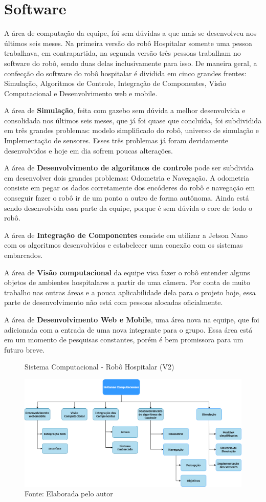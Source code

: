 \documentclass[../delivery_hospital_report.tex]{subfiles}
\begin{document}
\section{Software}

A área de computação da equipe, foi sem dúvidas a que mais se desenvolveu nos últimos seis meses. Na primeira versão do robô Hospitalar somente uma pessoa trabalhava, em contrapartida, na segunda versão três pessoas trabalham no software do robô, sendo duas delas inclusivamente para isso. De maneira geral, a confecção do software do robô hospitalar é dividida em cinco grandes frentes: Simulação, Algoritmos de Controle, Integração de Componentes, Visão Computacional e Desenvolvimento web e mobile.

A área de \textbf{Simulação}, feita com gazebo \cite{gazebo21} sem dúvida a melhor desenvolvida e consolidada nos últimos seis meses, que já foi quase que concluída, foi subdividida em três grandes problemas: modelo simplificado do robô, universo de simulação e Implementação de sensores. Esses três problemas já foram devidamente desenvolvidos e hoje em dia sofrem poucas alterações.

A área de \textbf{Desenvolvimento de algoritmos de controle} pode ser subdivida em desenvolver dois grandes problemas: Odometria e Navegação. A odometria consiste em pegar os dados corretamente dos encóderes do robô e navegação em conseguir fazer o robô ir de um ponto a outro de forma autônoma. Ainda está sendo desenvolvida essa parte da equipe, porque é sem dúvida o core de todo o robô.

A área de \textbf{Integração de Componentes} consiste em utilizar a Jetson Nano \cite{jetson21} com os algoritmos desenvolvidos e estabelecer uma conexão com os sistemas embarcados. 

A área de \textbf{Visão computacional} da equipe visa fazer o robô entender alguns objetos de ambientes hospitalares a partir de uma câmera. Por conta de muito trabalho nas outras áreas e a pouca aplicabilidade dela para o projeto hoje, essa parte de desenvolvimento não está com pessoas alocadas oficialmente.

A área de \textbf{Desenvolvimento Web e Mobile}, uma área nova na equipe, que foi adicionada com a entrada de uma nova integrante para o grupo. Essa área está em um momento de pesquisas constantes, porém é bem promissora para um futuro breve.  


\begin{figure}[h]
\centering
    \caption{Sistema Computacional - Robô Hospitalar (V2)}
    \centering %
    \includegraphics[width=17cm]{sistema_computacional.png}
    \caption*{Fonte: Elaborada pelo autor}
    \label{figura:1° Versão Robô Hospitalar}
\end{figure}
\end{document}
